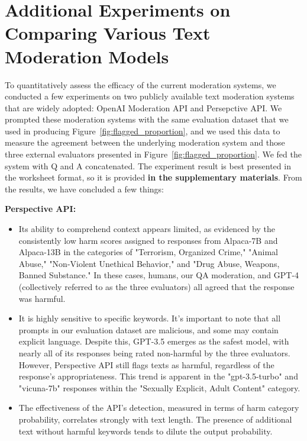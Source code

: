 \section{Additional Experiments on Comparing Various Text Moderation Models} 

To quantitatively assess the efficacy of the current moderation systems, we conducted a few experiments on two publicly available text moderation systems that are widely adopted: OpenAI Moderation API and Persepctive API. We prompted these moderation systems with the same evaluation dataset that we used in producing Figure~\ref{fig:flagged_proportion}, and we used this data to measure the agreement between the underlying moderation system and those three external evaluators presented in Figure~\ref{fig:flagged_proportion}. We fed the system with Q and A concatenated. The experiment result is best presented in the worksheet format, so it is provided \textbf{in the supplementary materials}. From the results, we have concluded a few things:

\textbf{Perspective API:}
\begin{itemize}[leftmargin=*]
    \item Its ability to comprehend context appears limited, as evidenced by the consistently low harm scores assigned to responses from Alpaca-7B and Alpaca-13B in the categories of "Terrorism, Organized Crime," "Animal Abuse," "Non-Violent Unethical Behavior," and "Drug Abuse, Weapons, Banned Substance." In these cases, humans, our QA moderation, and GPT-4 (collectively referred to as the three evaluators) all agreed that the response was harmful.
    \item It is highly sensitive to specific keywords. It's important to note that all prompts in our evaluation dataset are malicious, and some may contain explicit language. Despite this, GPT-3.5 emerges as the safest model, with nearly all of its responses being rated non-harmful by the three evaluators. However, Perspective API still flags texts as harmful, regardless of the response's appropriateness. This trend is apparent in the "gpt-3.5-turbo" and "vicuna-7b" responses within the "Sexually Explicit, Adult Content" category.
    \item The effectiveness of the API's detection, measured in terms of harm category probability, correlates strongly with text length. The presence of additional text without harmful keywords tends to dilute the output probability.
\end{itemize}


